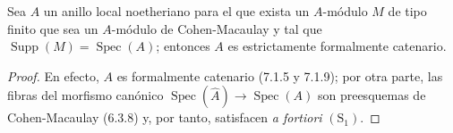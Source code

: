 
\begin{corollary}[7.2.7]
\label{IV.2.s7.2.7-fr}
Sea $A$ un anillo local noetheriano para el que exista un $A$-módulo $M$
de tipo finito que sea un $A$-módulo de Cohen-Macaulay y tal que
$\operatorname{Supp}(M)=\operatorname{Spec}(A)$; entonces $A$ es
estrictamente formalmente catenario.
\end{corollary}

\begin{proof}
En efecto, $A$ es formalmente catenario (7.1.5 y 7.1.9); por otra parte,
las fibras del morfismo canónico
$\operatorname{Spec}(\widehat A)\to\operatorname{Spec}(A)$ son
preesquemas de Cohen-Macaulay (6.3.8) y, por tanto, satisfacen \emph{a fortiori} $(\mathrm S_1)$.
\end{proof}
